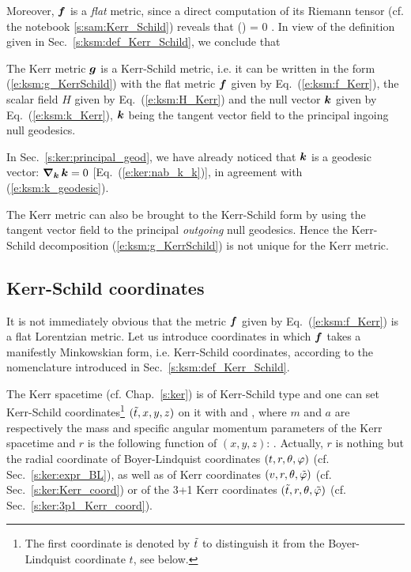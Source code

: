 Moreover, $\bm{f}$ is a \emph{flat} metric, since a direct computation of its
Riemann tensor (cf. the notebook \ref{s:sam:Kerr_Schild}) reveals that
\be
    () = 0 .
\ee
In view of the definition given in Sec.~\ref{s:ksm:def_Kerr_Schild},
we conclude that
\begin{greybox}
The Kerr metric $\bm{g}$ is a Kerr-Schild metric, i.e. it can be written in
the form (\ref{e:ksm:g_KerrSchild}) with the flat metric
$\bm{f}$ given by Eq.~(\ref{e:ksm:f_Kerr}), the scalar field $H$ given
by Eq.~(\ref{e:ksm:H_Kerr}) and the null vector $\bm{k}$ given by
Eq.~(\ref{e:ksm:k_Kerr}), $\bm{k}$ being the tangent vector field to
the principal ingoing null geodesics.
\end{greybox}
In Sec.~\ref{s:ker:principal_geod},
we have already noticed that $\bm{k}$ is a geodesic vector:
$\bm{\nabla}_{\bm{k}}\, \bm{k} = 0$ [Eq.~(\ref{e:ker:nab_k_k})], in agreement with
(\ref{e:ksm:k_geodesic}).

\begin{remark}
The Kerr metric can also be brought to the Kerr-Schild form by using the
tangent vector field to the principal \emph{outgoing} null geodesics. Hence
the Kerr-Schild decomposition (\ref{e:ksm:g_KerrSchild}) is not unique for
the Kerr metric.
\end{remark}

\subsection{Kerr-Schild coordinates}

It is not immediately obvious that the metric $\bm{f}$ given by
Eq.~(\ref{e:ksm:f_Kerr}) is a flat Lorentzian metric.
Let us introduce coordinates in which $\bm{f}$ takes a manifestly Minkowskian
form, i.e. Kerr-Schild coordinates, according to the nomenclature introduced
in Sec.~\ref{s:ksm:def_Kerr_Schild}.


The Kerr spacetime (cf. Chap.~\ref{s:ker}) is of Kerr-Schild type
and one can set Kerr-Schild coordinates\footnote{The first coordinate
is denoted by ${\tilde t}$ to distinguish it from the Boyer-Lindquist coordinate $t$,
see below.} $({\tilde t}, x, y, z)$ on it with
\be \label{e:ksm:H_Kerr}
\ee
and
\be \label{e:ksm:k_a_Kerr}
    ,
\ee
where $m$ and $a$ are respectively the mass and specific angular momentum
parameters of the Kerr spacetime and
$r$ is the following function of $(x,y,z)$:
\be \label{e:ksm:def_r}
    .
\ee
Actually, $r$ is nothing but the
radial coordinate of Boyer-Lindquist coordinates $(t,r,\theta,\varphi)$
(cf. Sec.~\ref{s:ker:expr_BL}),
as well as of Kerr coordinates $(v, r, \theta, {\tilde\varphi})$ (cf. Sec.~\ref{s:ker:Kerr_coord})
or of the 3+1 Kerr coordinates $({\tilde t}, r, \theta,{\tilde\varphi})$ (cf. Sec.~\ref{s:ker:3p1_Kerr_coord}).

